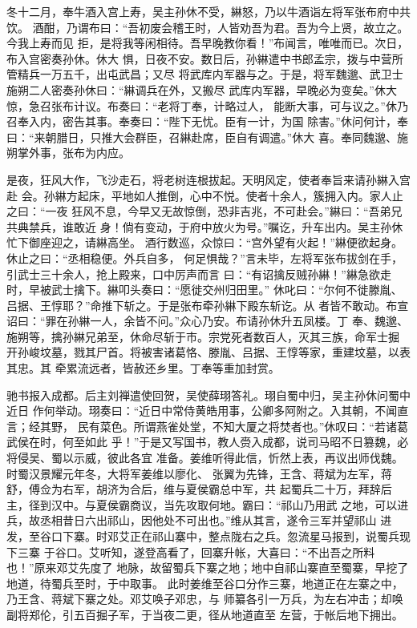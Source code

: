 冬十二月，奉牛酒入宫上寿，吴主孙休不受，綝怒，乃以牛酒诣左将军张布府中共饮。
酒酣，乃谓布曰：“吾初废会稽王时，人皆劝吾为君。吾为今上贤，故立之。今我上寿而见
拒，是将我等闲相待。吾早晚教你看！”布闻言，唯唯而已。次日，布入宫密奏孙休。休大
惧，日夜不安。数日后，孙綝遣中书郎孟宗，拨与中营所管精兵一万五千，出屯武昌；又尽
将武库内军器与之。于是，将军魏邈、武卫士施朔二人密奏孙休曰：“綝调兵在外，又搬尽
武库内军器，早晚必为变矣。”休大惊，急召张布计议。布奏曰：“老将丁奉，计略过人，
能断大事，可与议之。”休乃召奉入内，密告其事。奉奏曰：“陛下无忧。臣有一计，为国
除害。”休问何计，奉曰：“来朝腊日，只推大会群臣，召綝赴席，臣自有调遣。”休大
喜。奉同魏邈、施朔掌外事，张布为内应。

是夜，狂风大作，飞沙走石，将老树连根拔起。天明风定，使者奉旨来请孙綝入宫赴
会。孙綝方起床，平地如人推倒，心中不悦。使者十余人，簇拥入内。家人止之曰：“一夜
狂风不息，今早又无故惊倒，恐非吉兆，不可赴会。”綝曰：“吾弟兄共典禁兵，谁敢近
身！倘有变动，于府中放火为号。”嘱讫，升车出内。吴主孙休忙下御座迎之，请綝高坐。
酒行数巡，众惊曰：“宫外望有火起！”綝便欲起身。休止之曰：“丞相稳便。外兵自多，
何足惧哉？”言未毕，左将军张布拔剑在手，引武士三十余人，抢上殿来，口中厉声而言
曰：“有诏擒反贼孙綝！”綝急欲走时，早被武士擒下。綝叩头奏曰：“愿徙交州归田里。”
休叱曰：“尔何不徙滕胤、吕据、王惇耶？”命推下斩之。于是张布牵孙綝下殿东斩讫。从
者皆不敢动。布宣诏曰：“罪在孙綝一人，余皆不问。”众心乃安。布请孙休升五凤楼。丁
奉、魏邈、施朔等，擒孙綝兄弟至，休命尽斩于市。宗党死者数百人，灭其三族，命军士掘
开孙峻坟墓，戮其尸首。将被害诸葛恪、滕胤、吕据、王惇等家，重建坟墓，以表其忠。其
牵累流远者，皆赦还乡里。丁奉等重加封赏。

驰书报入成都。后主刘禅遣使回贺，吴使薛珝答礼。珝自蜀中归，吴主孙休问蜀中近日
作何举动。珝奏曰：“近日中常侍黄皓用事，公卿多阿附之。入其朝，不闻直言；经其野，
民有菜色。所谓燕雀处堂，不知大厦之将焚者也。”休叹曰：“若诸葛武侯在时，何至如此
乎！”于是又写国书，教人赍入成都，说司马昭不日篡魏，必将侵吴、蜀以示威，彼此各宜
准备。姜维听得此信，忻然上表，再议出师伐魏。时蜀汉景耀元年冬，大将军姜维以廖化、
张翼为先锋，王含、蒋斌为左军，蒋舒，傅佥为右军，胡济为合后，维与夏侯霸总中军，共
起蜀兵二十万，拜辞后主，径到汉中。与夏侯霸商议，当先攻取何地。霸曰：“祁山乃用武
之地，可以进兵，故丞相昔日六出祁山，因他处不可出也。”维从其言，遂令三军并望祁山
进发，至谷口下寨。时邓艾正在祁山寨中，整点陇右之兵。忽流星马报到，说蜀兵现下三寨
于谷口。艾听知，遂登高看了，回寨升帐，大喜曰：“不出吾之所料也！”原来邓艾先度了
地脉，故留蜀兵下寨之地；地中自祁山寨直至蜀寨，早挖了地道，待蜀兵至时，于中取事。
此时姜维至谷口分作三寨，地道正在左寨之中，乃王含、蒋斌下寨之处。邓艾唤子邓忠，与
师纂各引一万兵，为左右冲击；却唤副将郑伦，引五百掘子军，于当夜二更，径从地道直至
左营，于帐后地下拥出。

